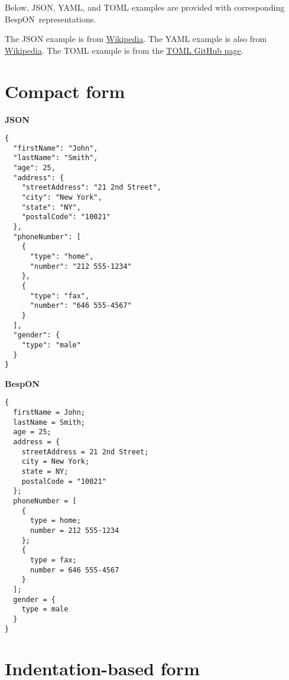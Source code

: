 \documentclass[11pt]{article}
\newcommand{\bespon}{BespON}
\begin{document}
\begin{appendices}

Below, JSON, YAML, and TOML examples are provided with corresponding \bespon\ representations.

The JSON example is from \href{https://en.wikipedia.org/wiki/JSON}{Wikipedia}.  The YAML example is also from \href{https://en.wikipedia.org/wiki/YAML}{Wikipedia}.  The TOML example is from the \href{https://github.com/toml-lang/toml}{TOML GitHub page}.


\section{Compact form}


\begin{tcolorbox}{}
\begin{multicols}{2}

\centering \textbf{JSON}
\begin{Verbatim}[formatcom=\color{DarkGreen}]
{
  "firstName": "John",
  "lastName": "Smith",
  "age": 25,
  "address": {
    "streetAddress": "21 2nd Street",
    "city": "New York",
    "state": "NY",
    "postalCode": "10021"
  },
  "phoneNumber": [
    {
      "type": "home",
      "number": "212 555-1234"
    },
    {
      "type": "fax",
      "number": "646 555-4567"
    }
  ],
  "gender": {
    "type": "male"
  }
}
\end{Verbatim}
\columnbreak
\centering \textbf{BespON}

\begin{Verbatim}
{
  firstName = John;
  lastName = Smith;
  age = 25;
  address = {
    streetAddress = 21 2nd Street;
    city = New York;
    state = NY;
    postalCode = "10021"
  };
  phoneNumber = [
    {
      type = home;
      number = 212 555-1234
    };
    {
      type = fax;
      number = 646 555-4567
    }
  ];
  gender = {
    type = male
  }
}
\end{Verbatim}
\end{multicols}
\end{tcolorbox}



\section{Indentation-based form}


\begin{tcolorbox}{}
\begin{multicols}{2}


\end{multicols}
\end{tcolorbox}
\end{appendices}
\end{document}
